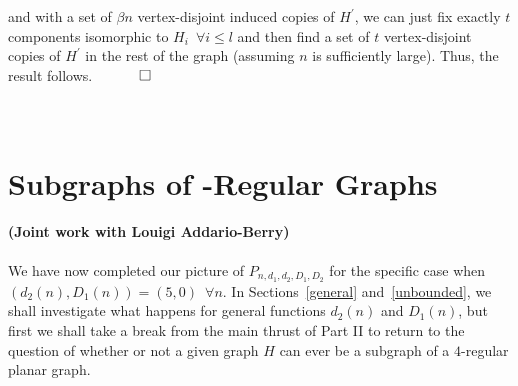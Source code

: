 \documentclass{article}
\newtheorem{Proof of Theorem}{Proof of Theorem}
\begin{document}
and with a set of $\beta n$ vertex-disjoint induced copies of $H^{\prime}$,
we can just fix exactly $t$ components isomorphic to $H_{i}$~$\forall i \leq l$
and then find a set of $t$ vertex-disjoint copies of $H^{\prime}$ in the rest of the graph
(assuming $n$ is sufficiently large).
Thus,
the result follows.
$\phantom{qwerty}
\setlength{\unitlength}{.25cm}
\begin{picture}(1,1)
\put(0,0){\line(1,0){1}}
\put(0,0){\line(0,1){1}}
\put(1,1){\line(-1,0){1}}
\put(1,1){\line(0,-1){1}}
\end{picture}$ \\
\\
\\













































\newpage
\section{Subgraphs of -Regular Graphs} \label{4reg}















\textbf{(Joint work with Louigi Addario-Berry)} \\
\\
We have now completed our picture of $P_{n,d_{1},d_{2},D_{1},D_{2}}$ for the specific case when
$(d_{2}(n),D_{1}(n)) = (5,0)$~$\forall n$.
In Sections~\ref{general} and~\ref{unbounded},
we shall investigate what happens for general functions $d_{2}(n)$ and $D_{1}(n)$,
but first we shall take a break from the main thrust of Part II to 
return to the question of whether or not a given graph $H$ can ever be a subgraph of a $4$-regular planar graph.
\end{document}
